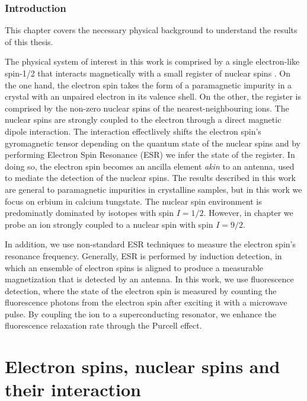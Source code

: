 \setchapterpreamble[u]{\margintoc}


\subsection*{Introduction}

This chapter covers the necessary physical background to understand the results of this thesis. 

The physical system of interest in this work is comprised by a single electron-like spin-1/2 that interacts magnetically with a small register of nuclear spins . On the one hand, the electron spin takes the form of a paramagnetic impurity in a crystal with an unpaired electron in its valence shell. On the other, the register is comprised by the non-zero nuclear spins of the nearest-neighbouring ions. The nuclear spins are strongly coupled to the electron through a direct magnetic dipole interaction. The interaction effectlively shifts the electron spin's gyromagnetic tensor depending on the quantum state of the nuclear spins and by performing Electron Spin Resonance (ESR) we infer the state of the register. In doing so, the electron spin becomes an ancilla element \textit{akin} to an antenna, used to mediate the detection of the nuclear spins. The results described in this work are general to paramagnetic impurities in crystalline samples, but in this work we focus on erbium in calcium tungstate. The nuclear spin environment is predominatly dominated by \W isotopes with spin $I=1/2$. However, in chapter  we probe an \Er ion strongly coupled to a \Nb nuclear spin with spin $I=9/2$.

In addition, we use non-standard ESR techniques to measure the electron spin's resonance frequency. Generally, ESR is performed by induction detection, in which an ensemble of electron spins is aligned to produce a measurable magnetization that is detected by an antenna. In this work, we use fluorescence detection, where the state of the electron spin is measured by counting the fluorescence photons from the electron spin after exciting it with a microwave pulse. By coupling the \Er ion to a superconducting resonator, we enhance the fluorescence relaxation rate through the Purcell effect.

\chapter{Electron spins, nuclear spins and their interaction}

